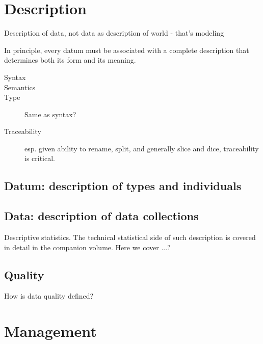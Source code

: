 \documentclass[reqno,12pt]{tufte-book}
\numberwithin{equation}{subsection}
\begin{document}
\part{Description}

\begin{ednote}
  Description of data, not data as description of world - that's modeling
\end{ednote}

In principle, every datum must be associated with a complete
description that determines both its form and its meaning.

\begin{description}
\item [Syntax]
\item [Semantics]
\item [Type]  Same as syntax?
\item [Traceability] esp. given ability to rename, split, and
  generally slice and dice, traceability is critical.
\end{description}

\chapter{Datum: description of types and individuals}

\chapter{Data: description of data collections}

Descriptive statistics.  The technical statistical side of such
description is covered in detail in the companion volume.  Here we
cover ...?

\chapter{Quality}

How is data quality defined?

\part{Management}
\end{document}
